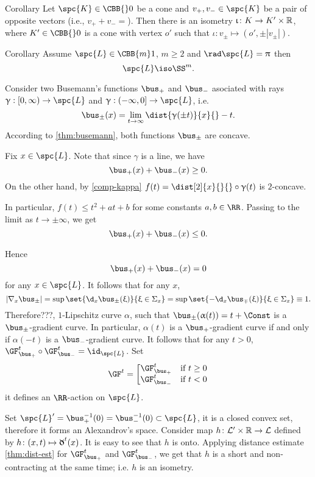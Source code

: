 \begin{thm}{Corollary}\label{cor:splitting-vectors}
Let $\spc{K}\in\CBB{}0$ be a cone and $v_+,v_-\in \spc{K}$ be a pair of opposite vectors 
(i.e., $v_+ + v_-=$).
Then there is an isometry $\iota\:K\to K'\times \RR$, where $K'\in\CBB{}0$ is a cone with vertex $o'$ such that
$\iota:v_\pm\mapsto (o',\pm|v_\pm|)$.
\end{thm}

\begin{thm}{Corollary}\label{cor:splitting-CBB[1]}
Assume $\spc{L}\in\CBB{m}1$, $m\ge2$ and $\rad\spc{L}=\pi$ then 
\[\spc{L}\iso \SS^m.\]
 
\end{thm}



 Consider two Busemann's functions $\bus_+$ and $\bus_-$ asociated with rays $\gamma:[0,\infty)\to \spc{L}$ and $\gamma:(-\infty,0]\to \spc{L}$, i.e.
\[
\bus_\pm(x)
=
\lim_{t\to\infty}\dist{\gamma(\pm t)}{x}{}- t.
\]
According to \ref{thm:busemann}, both functions $\bus_\pm$ are concave.

Fix $x\in \spc{L}$.
Note that since $\gamma$ is a line, we have 
\[\bus_+(x)+\bus_-(x)\ge0.\]
On the other hand, by \ref{comp-kappa} 
$f(t)=\dist[2]{x}{}{}\circ\gamma(t)$ 
is $2$-concave.
 
In particular, $f(t)\le t^2+at+b$ for some constants $a,b\in\RR$. 
Passing to the limit as $t\to\pm\infty$, we get \[\bus_+(x)+\bus_-(x)\le0.\]

Hence
\[
\bus_+(x)+\bus_-(x)= 0
\]
for any $x\in \spc{L}$.
It follows that for any $x$,
\[
|\nabla_x \bus_\pm|
=\sup\set{\d_x\bus_\pm(\xi)}{\xi\in\Sigma_x}
=\sup\set{-\d_x\bus_\mp(\xi)}{\xi\in\Sigma_x}\equiv1.
\] 
Therefore???, $1$-Lipschitz curve $\alpha$, such that $\bus_\pm(\alpha(t))=t+\Const$ is a $\bus_\pm$-gradient curve. 
In particular, $\alpha(t)$ is a $\bus_+$-gradient curve if and only if $\alpha(-t)$ is a $\bus_-$-gradient curve.
It follows that for any $t>0$, $\GF_{\bus_+}^t\circ\GF_{\bus_-}^t=\id_\spc{L}$.
Set
\[\GF^t=\left[\begin{matrix}
\GF_{\bus_+}^t&\hbox{if}\ t\ge0\\
\GF_{\bus_-}^t&\hbox{if}\ t<0
               \end{matrix}\right.\]
it defines an $\RR$-action on $\spc{L}$.

Set $\spc{L}'=\bus_+^{-1}(0)=\bus_-^{-1}(0)\subset \spc{L}$, it is a closed convex set, therefore it forms an Alexandrov's space.
Consider map $h\:\spc{L}'\times \RR\to \spc{L}$ defined by $h\:(x,t)\mapsto \GF^t(x)$.
It is easy to see that $h$ is onto.
Applying distance estimate \ref{thm:dist-est} for $\GF_{\bus_+}^t$ and $\GF_{\bus_-}^t$, we get that $h$ is a short and non-contracting at the same time; i.e. $h$ is an isometry.\qeds












